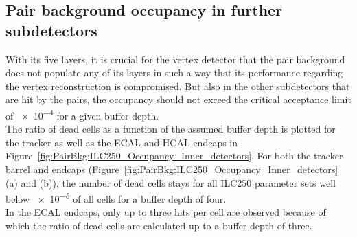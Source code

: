\subsection{Pair background occupancy in further \sid subdetectors}
\label{PairBkg:further_subdetectors}

With its five layers, it is crucial for the vertex detector that the pair background does not populate any of its layers in such a way that its performance regarding the vertex reconstruction is compromised. 
But also in the other \sid subdetectors that are hit by the \positron\electron pairs, the occupancy should not exceed the critical acceptance limit of \num{e-4} for a given buffer depth.
\\The ratio of dead cells as a function of the assumed buffer depth is plotted for the \sid tracker as well as the ECAL and HCAL endcaps in Figure~\ref{fig:PairBkg:ILC250_Occupancy_Inner_detectors}.
For both the tracker barrel and endcaps (Figure~\ref{fig:PairBkg:ILC250_Occupancy_Inner_detectors} (a) and (b)), the number of dead cells stays for all ILC250 parameter sets well below \num{e-5} of all cells for a buffer depth of four.
\\In the ECAL endcaps, only up to three hits per cell are observed because of which the ratio of dead cells are calculated up to a buffer depth of three.
